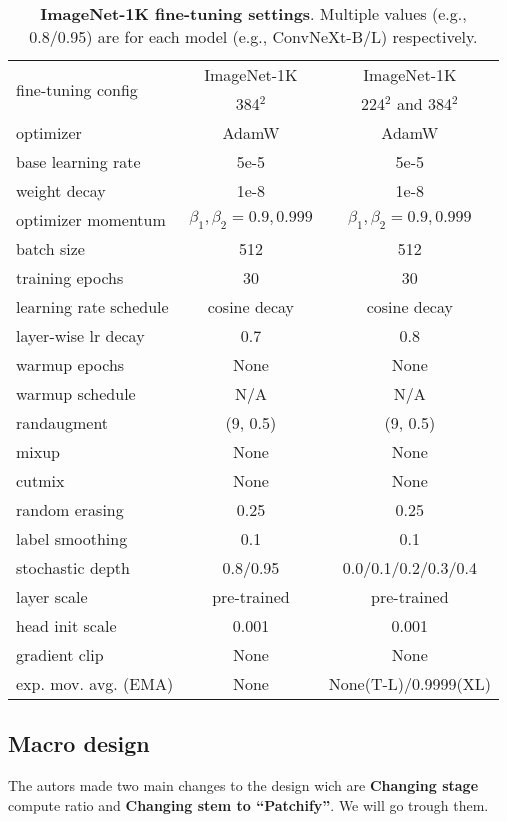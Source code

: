 \begin{table}[ht]
\begin{minipage}{.4\linewidth}
\begin{tabular}{@{\hskip -0.05ex}l@{\hskip 2.6ex}|cc}
\multirow{2}{*}{fine-tuning config} & ImageNet-1K   & ImageNet-1K  \\
 & 384$^2$ & 224$^2$ and 384$^2$ \\
\hline
optimizer & AdamW & AdamW\\
base learning rate & 5e-5 & 5e-5 \\
weight decay & 1e-8 & 1e-8 \\
optimizer momentum & $\beta_1, \beta_2{=}0.9, 0.999$ & $\beta_1, \beta_2{=}0.9, 0.999$ \\
batch size & 512 & 512 \\
training epochs & 30 & 30 \\
learning rate schedule & cosine decay & cosine decay \\
layer-wise lr decay & 0.7 & 0.8  \\
warmup epochs & None & None \\
warmup schedule & N/A & N/A \\
randaugment & (9, 0.5) & (9, 0.5) \\
mixup & None & None \\
cutmix  & None & None \\
random erasing & 0.25 & 0.25 \\
label smoothing  & 0.1 & 0.1 \\
stochastic depth  & 0.8/0.95 & 0.0/0.1/0.2/0.3/0.4 \\
layer scale & pre-trained & pre-trained \\
head init scale & 0.001 & 0.001 \\
gradient clip & None & None \\
exp. mov. avg. (EMA) & None & None(T-L)/0.9999(XL) \\
\end{tabular}
\caption{\textbf{ImageNet-1K fine-tuning settings}. Multiple values (e.g., 0.8/0.95) are for each model (e.g., ConvNeXt-B/L) respectively. }
\label{tab:ft_detail}
\end{minipage}
\end{table}



\newpage
\subsection*{Macro design}

The autors made two main changes to the design wich are \textbf{Changing stage} compute ratio and \textbf{Changing stem to “Patchify”}. We will go trough them.\\

